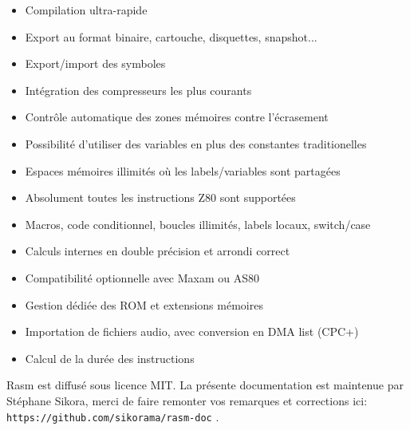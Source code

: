 \begin{xfr}
\begin{itemize}[noitemsep]
\item Compilation ultra-rapide
\item Export au format binaire, cartouche, disquettes, snapshot...
\item Export/import des symboles
\item Intégration des compresseurs les plus courants
\item Contrôle automatique des zones mémoires contre l'écrasement
\item Possibilité d'utiliser des variables en plus des constantes traditionelles
\item Espaces mémoires illimités où les labels/variables sont partagées
\item Absolument toutes les instructions Z80 sont supportées
\item Macros, code conditionnel, boucles illimités, labels locaux, switch/case
\item Calculs internes en double précision et arrondi correct
\item Compatibilité optionnelle avec Maxam ou AS80
\item Gestion dédiée des ROM et extensions mémoires
\item Importation de fichiers audio, avec conversion en DMA list (CPC+)
\item Calcul de la durée des instructions
\end{itemize}
\medskip
Rasm est diffusé sous licence MIT.
\medskip
La présente documentation est maintenue par Stéphane Sikora, merci de faire remonter vos remarques et corrections ici: \texttt{https://github.com/sikorama/rasm-doc} .
\end{xfr}

